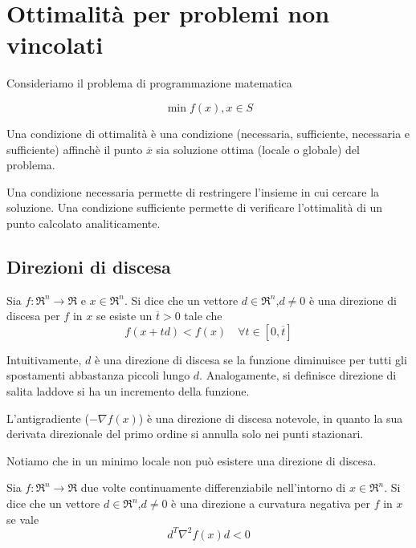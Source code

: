 \chapter{Ottimalità per problemi non vincolati}
\label{chp:optimality-unbounded-optimization-problems}

Consideriamo il problema di programmazione matematica

\begin{equation*}
\min f(x), x\in S
\end{equation*}

Una condizione di ottimalità è una condizione (necessaria, sufficiente, necessaria e sufficiente) affinchè il punto $\overline{x}$ sia soluzione ottima (locale o globale) del problema.

Una condizione necessaria permette di restringere l'insieme in cui cercare la soluzione. Una condizione sufficiente permette di verificare l'ottimalità di un punto calcolato analiticamente.


\section{Direzioni di discesa}

\begin{definition}
	\label{dfn:direction-descent}
	Sia $f:\Re^{n}\rightarrow\Re$ e $x\in\Re^{n}$. Si dice che un vettore $d\in\Re^{n}$,$d\neq 0$ è una direzione di discesa per $f$ in $x$ se esiste un $\overline{t}>0$ tale che
	\begin{equation}
	\label{eqn:direction-descent}
	f(x+td)<f(x)\quad\forall t\in[0,\overline{t}]
	\end{equation}
\end{definition}

Intuitivamente, $d$ è una direzione di discesa se la funzione diminuisce per tutti gli spostamenti abbastanza piccoli lungo $d$. Analogamente, si definisce direzione di salita laddove si ha un incremento della funzione.

L'antigradiente ($-\nabla f(x)$) è una direzione di discesa notevole, in quanto la sua derivata direzionale del primo ordine si annulla solo nei punti stazionari.

Notiamo che in un minimo locale non può esistere una direzione di discesa.

\begin{definition}
	\label{dfn:direction-curvature}
	Sia $f:\Re^{n}\rightarrow\Re$ due volte continuamente differenziabile nell'intorno di $x\in\Re^{n}$. Si dice che un vettore $d\in\Re^{n}$,$d\neq 0$ è una direzione a curvatura negativa per $f$ in $x$ se vale
	\begin{equation}
	\label{eqn:direction-curvature}
	d^{T}\nabla^{2} f(x) d < 0
	\end{equation}
\end{definition}

